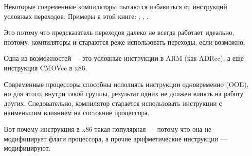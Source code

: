 ﻿

\label{branch_predictors}

Некоторые современные компиляторы пытаются избавиться от инструкций условных переходов.
Примеры в этой книге: , , .

Это потому что предсказатель переходов далеко не всегда работает идеально, поэтому, компиляторы и стараются
реже использовать переходы, если возможно.

Одна из возможностей --- это условные инструкции в ARM (как ADRcc), а еще инструкция CMOVcc в x86.


Современные процессоры способны исполнять инструкции одновременно (\ac{OOE}), но для этого,
внутри такой группы, результат одних не должен влиять на работу других.
Следовательно, компилятор старается использовать инструкции с наименьшим влиянием на состояние процессора.

Вот почему инструкция \LEA в x86 такая популярная --- 
потому что она не модифицирует флаги процессора,
а прочие арифметические инструкции --- модифицируют.

